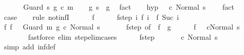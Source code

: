 \begin{isabellebody}
\ \ \isamarkupfalse%
\isanewline
{}\isamarkupfalse%
\isanewline
\ \ \isamarkupfalse%
\ {\isacharparenleft}Guard\ s\ g\ c\ m{\isacharparenright}\isanewline
\ \ \isamarkupfalse%
\ g{\isacharcolon}\ {\isachardoublequoteopen}s\ {\isasymin}\ g{\isachardoublequoteclose}\ \isamarkupfalse%
\ fact\isanewline
\ \ \isamarkupfalse%
\ hyp{\isacharcolon}\ {\isachardoublequoteopen}{\isasymnot}\ {\isasymGamma}{\isasymturnstile}\ {\isacharparenleft}c{\isacharcomma}\ Normal\ s{\isacharparenright}\ {\isasymrightarrow}\ {\isasymdots}{\isacharparenleft}{\isasyminfinity}{\isacharparenright}{\isachardoublequoteclose}\ \isamarkupfalse%
\ fact\isanewline
\ \ \isamarkupfalse%
\ {\isacharquery}case\isanewline
\ \ \isamarkupfalse%
\ {\isacharparenleft}rule\ not{\isacharunderscore}infI{\isacharparenright}\isanewline
\ \ \ \ \isamarkupfalse%
\ f\isanewline
\ \ \ \ \isamarkupfalse%
\ f{\isacharunderscore}step{\isacharcolon}\ {\isachardoublequoteopen}{\isasymAnd}i{\isachardot}\ {\isasymGamma}{\isasymturnstile}f\ i\ {\isasymrightarrow}\ f\ {\isacharparenleft}Suc\ i{\isacharparenright}{\isachardoublequoteclose}\isanewline
\ \ \ \ \isamarkupfalse%
\ f{\isacharunderscore}{}{\isacharcolon}\ {\isachardoublequoteopen}f\ {}\ {\isacharequal}\ {\isacharparenleft}Guard\ m\ g\ c{\isacharcomma}\ Normal\ s{\isacharparenright}{\isachardoublequoteclose}\ \isanewline
\ \ \ \ \isamarkupfalse%
\ f{\isacharunderscore}step\ {\isacharbrackleft}of\ {}{\isacharbrackright}\ f{\isacharunderscore}{}\ \ g\isanewline
\ \ \ \ \isamarkupfalse%
\ {\isachardoublequoteopen}f\ {}\ {\isacharequal}\ {\isacharparenleft}c{\isacharcomma}Normal\ s{\isacharparenright}{\isachardoublequoteclose}\isanewline
\ \ \ \ \ \ \isamarkupfalse%
\ {\isacharparenleft}fastforce\ elim{\isacharcolon}\ step{\isacharunderscore}elim{\isacharunderscore}cases{\isacharparenright}\isanewline
\ \ \ \ \isamarkupfalse%
\ f{\isacharunderscore}step\isanewline
\ \ \ \ \isamarkupfalse%
\ {\isachardoublequoteopen}{\isasymGamma}{\isasymturnstile}\ {\isacharparenleft}c{\isacharcomma}\ Normal\ s{\isacharparenright}\ {\isasymrightarrow}\ {\isasymdots}{\isacharparenleft}{\isasyminfinity}{\isacharparenright}{\isachardoublequoteclose}\isanewline
\ \ \ \ \ \ \isamarkupfalse%
\ {\isacharparenleft}simp\ add{\isacharcolon}\ inf{\isacharunderscore}def{\isacharparenright}\isanewline

\end{isabellebody}
